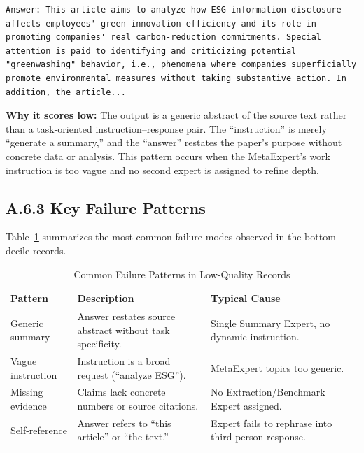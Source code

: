 \begin{lstlisting}[breaklines]
Answer: This article aims to analyze how ESG information disclosure affects employees' green innovation efficiency and its role in promoting companies' real carbon-reduction commitments. Special attention is paid to identifying and criticizing potential "greenwashing" behavior, i.e., phenomena where companies superficially promote environmental measures without taking substantive action. In addition, the article...
\end{lstlisting}

\noindent\textbf{Why it scores low:} The output is a generic abstract of the source text rather than a task-oriented instruction--response pair. The ``instruction'' is merely ``generate a summary,'' and the ``answer'' restates the paper's purpose without concrete data or analysis. This pattern occurs when the MetaExpert's work instruction is too vague and no second expert is assigned to refine depth.

\subsection*{A.6.3 Key Failure Patterns}

Table~\ref{tab:failure} summarizes the most common failure modes observed in the bottom-decile records.

\begin{table}[h]
\centering
\caption{Common Failure Patterns in Low-Quality Records}
\label{tab:failure}
\small
\begin{tabular}{@{}p{3cm}p{5cm}p{4cm}@{}}
\toprule
\textbf{Pattern} & \textbf{Description} & \textbf{Typical Cause} \\
\midrule
Generic summary & Answer restates source abstract without task specificity. & Single Summary Expert, no dynamic instruction. \\
Vague instruction & Instruction is a broad request (``analyze ESG''). & MetaExpert topics too generic. \\
Missing evidence & Claims lack concrete numbers or source citations. & No Extraction/Benchmark Expert assigned. \\
Self-reference & Answer refers to ``this article'' or ``the text.'' & Expert fails to rephrase into third-person response. \\
\bottomrule
\end{tabular}
\end{table}
